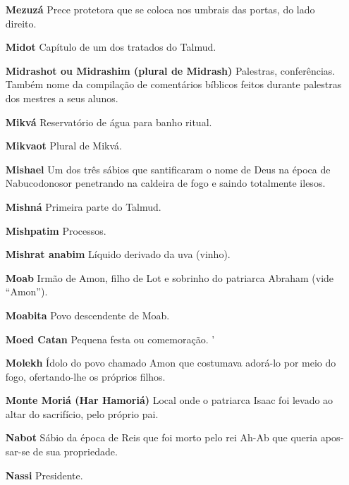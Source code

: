 \begin{itemize}
\item[\textbf{Mezuzá}] Prece protetora que se co­loca nos umbrais das portas,
do lado direito.

\item[\textbf{Midot}] Capítulo de um dos tratados do Talmud.

\item[\textbf{Midrashot ou Midrashim (plural de Midrash)}] Palestras,
conferências. Também nome da compilação de co­mentários bíblicos feitos
durante pales­tras dos mestres a seus alunos.

\item[\textbf{Mikvá}] Reservatório de água para ba­nho ritual.

\item[\textbf{Mikvaot}] Plural de Mikvá.

\item[\textbf{Mishael}] Um dos três sábios que san­tificaram o nome de Deus
na época de Nabucodonosor penetrando na caldei­ra de fogo e saindo
totalmente ilesos.

\item[\textbf{Mishná}] Primeira parte do Talmud.

\item[\textbf{Mishpatim}] Processos.

\item[\textbf{Mishrat anabim}] Líquido derivado da uva (vinho).

\item[\textbf{Moab}] Irmão de Amon, filho de Lot e sobrinho do patriarca
Abraham (vi­de ``Amon'').

\item[\textbf{Moabita}] Povo descendente de Moab.

\item[\textbf{Moed Catan}] Pequena festa ou come­moração. '

\item[\textbf{Molekh}] Ídolo do povo chamado Amon que costumava adorá-lo por
meio do fogo, ofertando-lhe os pró­prios filhos.

\item[\textbf{Monte Moriá (Har Hamoriá)}] Local onde o patriarca Isaac foi
levado ao al­tar do sacrifício, pelo próprio pai.

\item[\textbf{Nabot}] Sábio da época de Reis que foi morto pelo rei Ah-Ab que
queria apos­sar-se de sua propriedade.

\item[\textbf{Nassi}] Presidente.


\end{itemize}
